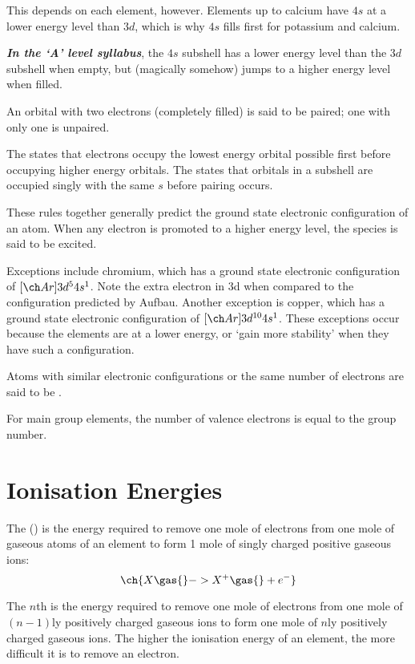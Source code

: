 \documentclass[Chemistry.tex]{subfiles}
\begin{document}
This depends on each element, however. Elements up to calcium have \(4s\) at a lower energy level than \(3d\), which is why \(4s\) fills first for potassium and calcium.

\emph{\textbf{In the `A' level syllabus}}, the \(4s\) subshell has a lower energy level than the \(3d\) subshell when empty, but (magically somehow) jumps to a higher energy level when filled.

An orbital with two electrons (completely filled) is said to be paired; one with only one is unpaired.

The  states that electrons occupy the lowest energy orbital possible first before occupying higher energy orbitals. The  states that orbitals in a subshell are occupied singly with the same \(s\) before pairing occurs.

These rules together generally predict the ground state electronic configuration of an atom. When any electron is promoted to a higher energy level, the species is said to be excited.

Exceptions include chromium, which has a ground state electronic configuration of \(\conc{Ar} 3d^5 4s^1\). Note the extra electron in 3d when compared to the configuration predicted by Aufbau. Another exception is copper, which has a ground state electronic configuration of \(\conc{Ar} 3d^{10} 4s^1\). These exceptions occur because the elements are at a lower energy, or `gain more stability' when they have such a configuration.

Atoms with similar electronic configurations or the same number of electrons are said to be .

For main group elements, the number of valence electrons is equal to the group number.
\section{Ionisation Energies}
The  () is the energy required to remove one mole of electrons from one mole of gaseous atoms of an element to form 1 mole of singly charged positive gaseous ions: \begin{equation}\ch{X\gas{} -> X^+\gas{} + e^-}\end{equation}

The \(n\)th \slIE{} is the energy required to remove one mole of electrons from one mole of \((n-1)\)ly positively charged gaseous ions to form one mole of \(n\)ly positively charged gaseous ions. The higher the ionisation energy of an element, the more difficult it is to remove an electron.
\end{document}
